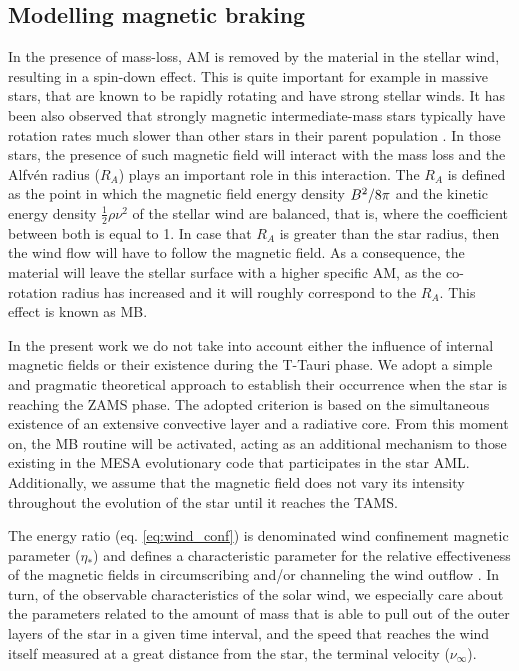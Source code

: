 \documentclass[fleqn,usenatbib]{mnras}
\begin{document}
\subsection{Modelling magnetic braking} \label{mod_mb}
In the presence of mass-loss, AM is removed by the material in the stellar wind, resulting in a spin-down effect. This is quite important for example in massive stars, that are known to be rapidly rotating and have strong stellar winds. It has been also observed that strongly magnetic intermediate-mass stars typically have rotation rates much slower than other stars in their parent population \citep{Mathys2006}. In those stars, the presence of such magnetic field will interact with the mass loss and the Alfv\'{e}n radius ($R_{A}$) plays an important role in this interaction. The $R_{A}$ is defined as the point in which the magnetic field energy density $B^{2}/8\pi$ and the kinetic energy density $\frac{1}{2}\rho\nu^{2}$ of the stellar wind are balanced, that is, where the coefficient between both is equal to 1. In case that $R_{A}$ is greater than the star radius, then the wind flow will have to follow the magnetic field. As a consequence, the material will leave the stellar surface with a higher specific AM, as the co-rotation radius has increased and it will roughly correspond to the $R_{A}$. This effect is known as MB.\par

In the present work we do not take into account either the influence of internal magnetic fields or their existence during the T-Tauri phase. We adopt a simple and pragmatic theoretical approach to establish their occurrence when the star is reaching the ZAMS phase. The adopted criterion is based on the simultaneous existence of an extensive convective layer and a radiative core. From this moment on, the MB routine will be activated, acting as an additional mechanism to those existing in the MESA evolutionary code that participates in the star AML. Additionally, we assume that the magnetic field does not vary its intensity throughout the evolution of the star until it reaches the TAMS.\par

The energy ratio (eq. \ref{eq:wind_conf}) is denominated wind confinement magnetic parameter ($\eta_*$) and defines a characteristic parameter for the relative effectiveness of the magnetic fields in circumscribing and/or channeling the wind outflow \citep{UdDoula2002}. In turn, of the observable characteristics of the solar wind, we especially care about the parameters related to the amount of mass that is able to pull out of the outer layers of the star in a given time interval, and the speed that reaches the wind itself measured at a great distance from the star, the terminal velocity ($\nu_\infty$).\par
\end{document}

